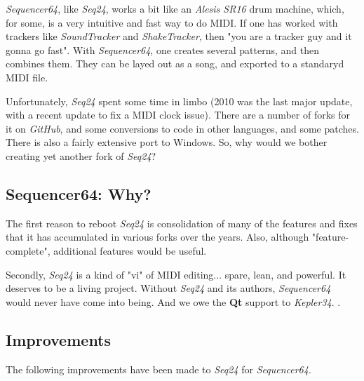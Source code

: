 \documentclass[
 11pt,
 twoside,
 a4paper,
 headinclude,
 footinclude,
 final                                 %
]{article}
\begin{document}
   \textsl{Sequencer64}, like \textsl{Seq24},
   works a bit like an \textsl{Alesis SR16} drum machine,
   which, for some, is a very intuitive and fast way to do MIDI.
   If one has worked with trackers like \textsl{SoundTracker} and
   \textsl{ShakeTracker}, then "you are a tracker guy and it gonna go fast".
   With \textsl{Sequencer64}, one creates several patterns, and then
   combines them.  They can be layed out as a song, and exported to a standaryd
   MIDI file.

   Unfortunately, \textsl{Seq24} spent some time in limbo
   (2010 was the last major update, with a
   recent update to fix a MIDI clock issue).  There are a number of
   forks for it on \textsl{GitHub}, and some conversions
   to code in other languages, and some patches.
   There is also a fairly extensive port to Windows.
   So, why would we bother creating yet another fork of \textsl{Seq24}?

\subsection{Sequencer64: Why?}
\label{subsec:introduction_seq64_vs_others}

   The first reason to reboot \textsl{Seq24} is consolidation of many of the
   features and fixes that it has accumulated in various forks over the years.
   Also, although "feature-complete", additional features would be useful.

   Secondly, \textsl{Seq24} is a kind of "vi" of MIDI editing... spare,
   lean, and powerful.  It deserves to be a living project.  Without
   \textsl{Seq24} and its authors, \textsl{Sequencer64} would never have come
   into being.  And we owe the \textbf{Qt} support to \textsl{Kepler34}.
   \cite{kepler34}.

\subsection{Improvements}
\label{subsec:improvements}

   The following improvements have been made to \textsl{Seq24} for
   \textsl{Sequencer64}.
\end{document}
